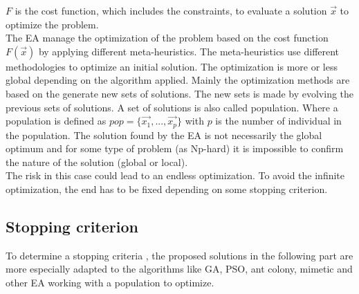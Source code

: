  $F$ is the cost function, which includes the constraints, to evaluate a solution $\vec{x}$ to optimize the problem. \\
The EA manage the optimization of the problem based on the cost function $F(\vec{x})$ by applying different meta-heuristics. 
The meta-heuristics use different methodologies to optimize an initial solution. The optimization is more or less global depending on the algorithm applied. 
Mainly the optimization methods are based on the generate new sets of solutions. The new sets is made by evolving the previous sets of solutions. A set of solutions is also called population. %
Where a population is defined as $pop=\{\vec{x_1}, ...,\vec{x_p}  \}$ with $p$ is the number of individual in the population. 
The solution found by the EA is not necessarily the global optimum and for some type of problem (as Np-hard) it is impossible to confirm the nature of the solution (global or local). \\
The risk in this case could lead to an endless optimization. To avoid the infinite optimization, the end has to be fixed depending on some stopping criterion.

\subsection{Stopping criterion}
 
To  determine a stopping criteria , the proposed solutions in the following part are more especially adapted to the algorithms like GA, PSO, ant colony, mimetic and other EA working with a population to optimize.



